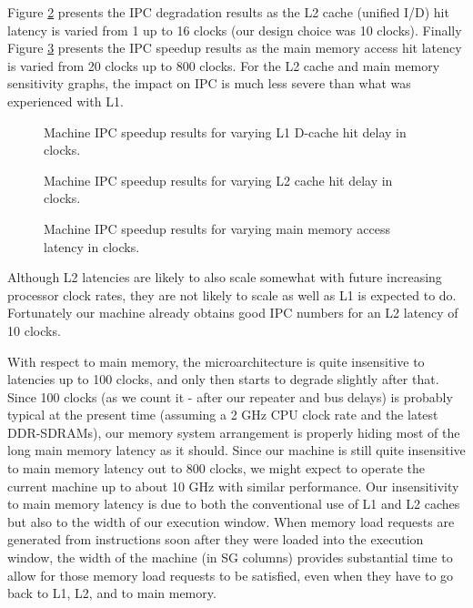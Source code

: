\documentclass[10pt,twocolumn,dvips]{article}
\begin{document}
Figure \ref{fig:l2cache} presents the IPC degradation results
as the L2 cache (unified I/D) hit latency is varied from 
1 up to 16 clocks (our design choice was 10 clocks).
Finally Figure \ref{fig:dram} presents the IPC speedup results
as the main memory access hit latency is varied from 20 clocks 
up to 800 clocks.
For the L2 cache and main memory sensitivity graphs, the impact
on IPC is much less severe than what was experienced with L1. 
%
%
\begin{figure}
\centering
{}
\caption{Machine IPC speedup results for varying 
L1 D-cache hit delay in clocks.}
\label{fig:l1dcache}
\end{figure}
\begin{figure}
\centering
{}
\caption{Machine IPC speedup results for varying 
L2 cache hit delay in clocks.}
\label{fig:l2cache}
\end{figure}
\begin{figure}
\centering
{}
\caption{Machine IPC speedup results for varying 
main memory access latency in clocks.}
\label{fig:dram}
\end{figure}
%
%
Although L2 latencies are likely to also scale somewhat
with future increasing processor clock rates, they are not likely
to scale as well as L1 is expected to do.
Fortunately our machine already obtains good IPC numbers
for an L2 latency of 10 clocks. 

With respect to main memory, the microarchitecture
is quite insensitive to latencies up to 100 clocks,
and only then starts to degrade slightly after that.  
Since 100 clocks
(as we count it - after our repeater and bus delays)
is probably typical at the present time (assuming a 2 GHz
CPU clock rate and the latest DDR-SDRAMs), our memory system
arrangement is properly hiding most of the long main memory latency as it
should.  
Since our machine is still quite insensitive to
main memory latency out to 800 clocks, we might expect to
operate the current machine up to about 10 GHz with similar performance.
Our insensitivity to main memory latency is due to both the conventional
use of L1 and L2 caches but also to the width of our execution window.
When memory load requests are generated from instructions
soon after they were loaded into
the execution window, the width of the machine (in SG columns) provides
substantial time to allow for those memory load requests to
be satisfied, even when they have to go back to L1, L2, and to
main memory.
%
\end{document}
